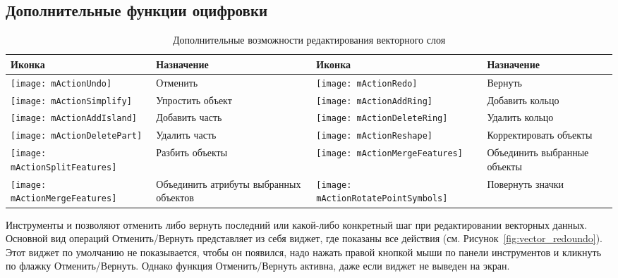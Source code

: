 \subsection{Дополнительные функции оцифровки}
\label{sec:advanced_edit}

\begin{table}[h]
\centering
\small
\begin{tabular}{|l|p{6.9cm}|l|p{6.9cm}|}
\hline \textbf{Иконка} & \textbf{Назначение} & \textbf{Иконка} & \textbf{Назначение} \\
\hline \texttt{[image: mActionUndo]}
   & Отменить
   & \texttt{[image: mActionRedo]}
   & Вернуть \\
\hline \texttt{[image: mActionSimplify]}
   & Упростить объект
   & \texttt{[image: mActionAddRing]}
   & Добавить кольцо \\
\hline \texttt{[image: mActionAddIsland]}
   & Добавить часть
   & \texttt{[image: mActionDeleteRing]}
   & Удалить кольцо \\
\hline \texttt{[image: mActionDeletePart]}
   & Удалить часть
   & \texttt{[image: mActionReshape]}
   & Корректировать объекты \\
\hline \texttt{[image: mActionSplitFeatures]}
   & Разбить объекты
   & \texttt{[image: mActionMergeFeatures]}
   & Объединить выбранные объекты \\
\hline \texttt{[image: mActionMergeFeatures]}
   & Объединить атрибуты выбранных объектов
   &\texttt{[image: mActionRotatePointSymbols]}
   & Повернуть значки \\
\hline
\end{tabular}
\caption{Дополнительные возможности редактирования векторного слоя}\label{tab:advanced_editing}
\end{table}


Инструменты  и
 позволяют отменить либо вернуть
последний или какой-либо конкретный шаг при редактировании векторных данных.
Основной вид операций Отменить/Вернуть представляет из себя виджет, где
показаны все действия (см. Рисунок~\ref{fig:vector_redoundo}). Этот виджет
по умолчанию не показывается, чтобы он появился, надо нажать правой кнопкой
мыши по панели инструментов и кликнуть по флажку Отменить/Вернуть. Однако
функция Отменить/Вернуть активна, даже если виджет не выведен на экран.

